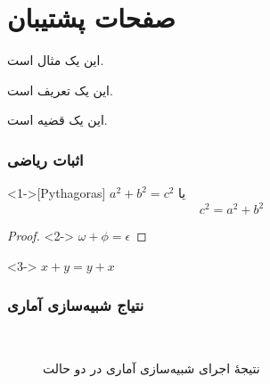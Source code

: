 \documentclass[xcolor=dvipsnames, professionalfonts, aspectratio=169, 11pt]{beamer}
\begin{document}
\section{صفحات پشتیبان}

\begin{frame}

    \begin{example}
    این یک مثال است.
    \end{example}

    \begin{definition}
    این یک تعریف است.
    \end{definition}

    \begin{theorem}
    این یک قضیه است.
    \end{theorem}
\end{frame}

\begin{frame}
\frametitle{اثبات ریاضی}
\begin{theorem}<1->[Pythagoras]
$ a^2 + b^2 = c^2$
یا
    \[c^2=a^2+b^2\]
\end{theorem}
\begin{proof}<2->
$\omega +\phi = \epsilon $
\end{proof}
\begin{corollary}<3->
$ x + y = y + x  $
\end{corollary}
\end{frame}

\begin{frame}[noframenumbering]
    \frametitle{نتیاج شبیه‌سازی آماری}

    \begin{figure}[htb]
        \centering
        \
        \caption{نتیجهٔ اجرای شبیه‌سازی آماری در دو حالت}
        \label{fig:ode-sais}
    \end{figure}

\end{frame}
\end{document}
